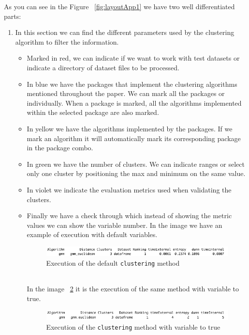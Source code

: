As you can see in the Figure ~\ref{fig:layoutApp1} we have two well differentiated parts:
\begin{enumerate}
  \item In this section we can find the different parameters used by the clustering algorithm to filter the information.
  \begin{itemize}
  \item Marked in red, we can indicate if we want to work with test datasets or indicate a directory of dataset files to be processed.
  \item In blue we have the packages that implement the clustering algorithms mentioned throughout the paper. We can mark all the packages or individually. When a package is marked, all the algorithms implemented within the selected package are also marked.
  \item In yellow we have the algorithms implemented by the packages. If we mark an algorithm it will automatically mark its corresponding package in the package combo.
  \item In green we have the number of clusters. We can indicate ranges or select only one cluster by positioning the max and minimum on the same value.
  \item In violet we indicate the evaluation metrics used when validating the clusters.
  \item Finally we have a check through which instead of showing the metric values we can show the variable number. In the image we have an example of execution with default variables.
\begin{figure}[htbp]
  \centering
   \includegraphics[width=14cm]{img/variable_false}
    \caption{Execution of the default \texttt{clustering} method}
    \label{fig:variable_false}%
\end{figure}
\\
In the image ~\ref{fig:variable_true} it is the execution of the same method with variable to true.
\begin{figure}[htbp]
  \centering
   \includegraphics[width=14cm]{img/variable_true}
    \caption{Execution of the \texttt{clustering} method with variable to true}
    \label{fig:variable_true}%
\end{figure}
\\

\end{itemize}
\end{enumerate}
